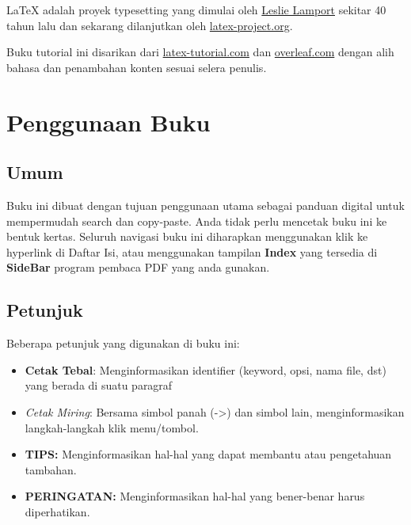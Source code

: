 \documentclass{book} %
\begin{document}
    \LaTeX{} adalah proyek typesetting yang dimulai oleh \href{https://en.wikipedia.org/wiki/Leslie_Lamport}{Leslie Lamport}
    sekitar 40 tahun lalu dan sekarang dilanjutkan oleh \href{https://www.latex-project.org/}{latex-project.org}.

    \bigskip %

    Buku tutorial ini disarikan dari \href{https://latex-tutorial.com/tutorials}{latex-tutorial.com}
    dan \href{https://www.overleaf.com/learn/latex/Tutorials}{overleaf.com} dengan alih bahasa dan penambahan konten sesuai selera penulis.


	\newpage
	\chapter{Penggunaan Buku}

	\section{Umum} %
	Buku ini dibuat dengan tujuan penggunaan utama sebagai panduan digital untuk mempermudah search dan copy-paste.
	Anda tidak perlu mencetak buku ini ke bentuk kertas.
	Seluruh navigasi buku ini diharapkan menggunakan klik ke hyperlink di Daftar Isi,
	atau menggunakan tampilan \textbf{Index} yang tersedia di \textbf{SideBar} program pembaca PDF yang anda gunakan.

	\section{Petunjuk}
	Beberapa petunjuk yang digunakan di buku ini:
	\begin{itemize} %
		\item \textbf{Cetak Tebal}: Menginformasikan identifier (keyword, opsi, nama file, dst) yang berada di suatu paragraf
		\item \textit{Cetak Miring}: Bersama simbol panah (->) dan simbol lain, menginformasikan langkah-langkah klik menu/tombol.
		\item \textbf{TIPS:} Menginformasikan hal-hal yang dapat membantu atau pengetahuan tambahan.
		\item \textbf{PERINGATAN:} Menginformasikan hal-hal yang bener-benar harus diperhatikan.
	\end{itemize}
\end{document}
